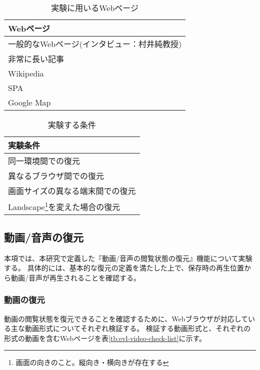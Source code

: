 \begin{table}[htbp]
  \label{tb:evl-basic-web-contents}
  \caption{実験に用いるWebページ}
  \begin{center}
    \begin{tabular}{|l|}
    \hline
    Webページ  \\ \hline
    一般的なWebページ(インタビュー：村井純教授) \\ \hline
    非常に長い記事 \\ \hline
    Wikipedia \\ \hline
    SPA \\ \hline
    Google Map \\ \hline
    \end{tabular}
  \end{center}
\end{table}

\begin{table}[htbp]
  \label{tb:evl-basic-conditions}
  \caption{実験する条件}
  \begin{center}
    \begin{tabular}{|l|}
    \hline
    実験条件  \\ \hline
    同一環境間での復元 \\ \hline
    異なるブラウザ間での復元 \\ \hline
    画面サイズの異なる端末間での復元 \\ \hline
    Landscape\footnote{画面の向きのこと。縦向き・横向きが存在する}を変えた場合の復元 \\ \hline
    \end{tabular}
  \end{center}
\end{table}

\subsection{動画/音声の復元}
本項では、本研究で定義した『動画/音声の閲覧状態の復元』機能について実験する。
具体的には、基本的な復元の定義を満たした上で、保存時の再生位置から動画/音声が再生されることを確認する。

\subsubsection{動画の復元}
動画の閲覧状態を復元できることを確認するために、Webブラウザが対応している主な動画形式についてそれぞれ検証する。
検証する動画形式と、それぞれの形式の動画を含むWebページを表\ref{tb:evl-video-check-list}に示す。

